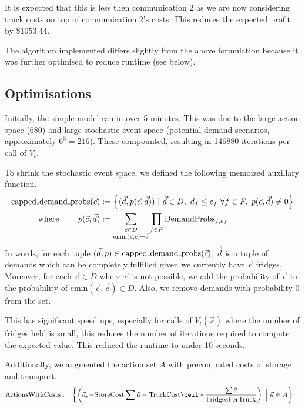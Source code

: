 \documentclass[11pt,a4paper]{article}
\begin{document}
It is expected that this is less then communication 2 as we are now considering 
truck costs on top of communication 2's costs. This 
reduces the expected profit by \$1053.44.

The algorithm implemented differs slightly from the above 
formulation because it was further optimised to reduce runtime (see below).

\subsection{Optimisations}
Initially, the simple model ran in over 5 minutes. This was due to the large 
action space (680) and large stochastic event space (potential demand scenarios, approximately $6^3=216$).
These compounted, resulting in 146880 iterations per call of $V_t$.

To shrink the stochastic event space, we defined the following memoized auxillary function.
\begin{align*}
    \mathrm{capped{\mathunderscore}demand{\mathunderscore}probs}(\vec c) &:= \left\{ (\vec d, p(\vec c, \vec d)) ~|~  \vec d \in D,~d_f \le c_f ~\forall f \in F, ~ p(\vec c, \vec d) \ne 0\right\} \\ 
    \text{where }\quad \quad p(\vec c, \vec d) &:= \sum_{\substack{\vec e \in D \\ \mathrm{emin}(\vec e, \vec c) = \vec d}} \prod_{f \in F}\mathrm{DemandProbs}_{f,e_f}
\end{align*}
In words, for each tuple $(\vec d, p) \in \mathrm{capped{\mathunderscore}demand{\mathunderscore}probs}(\vec c)$,
$\vec d$ is a tuple of demands which can be completely fulfilled given we currently have $\vec c$ 
fridges. Moreover, for each $\vec e \in D$ where $\vec e$ is not possible, we add 
the probability of $\vec e$ to the probability of $\mathrm{emin}(\vec e, \vec c) \in D$. 
Also, we remove demands with probability 0 from the set.

This has significant speed ups, especially for calls of $V_t(\vec s)$ where the number 
of fridges held is small, this reduces the number of iterations required to compute 
the expected value. This reduced the runtime to under 10 seconds.

Additionally, we augmented the action set $A$ with precomputed costs of storage and transport.
\begin{align*}
    \mathrm{ActionsWithCosts} &:= \left\{ \left(\vec a, 
    -\mathrm{StoreCost}\sum\vec a 
        -\mathrm{TruckCost} \ceil*{\frac{\sum \vec a}{\mathrm{FridgesPerTruck}}} \right) ~\Big|~ \vec a \in A\right\}
\end{align*}
\end{document}
